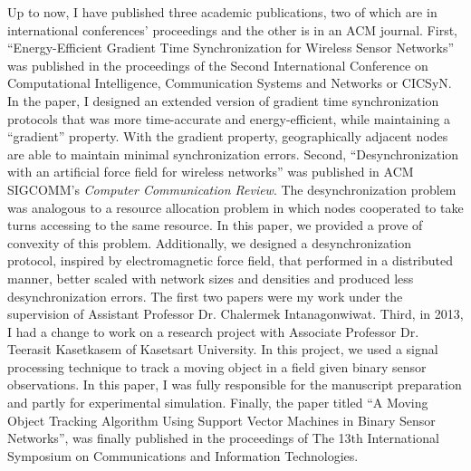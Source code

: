 \documentclass[a4paper,10pt]{report}
\begin{document}
\vspace{0.2cm}
Up to now, I have published three academic publications, two of which are in international conferences' proceedings and the other is in an ACM journal.  First, ``Energy-Efficient Gradient Time Synchronization for Wireless Sensor Networks'' was published in the proceedings of the Second International Conference on Computational Intelligence, Communication Systems and Networks or CICSyN. In the paper, I designed an extended version of gradient time synchronization protocols that was more time-accurate and energy-efficient, while maintaining a ``gradient'' property. With the gradient property, geographically adjacent nodes are able to maintain minimal synchronization errors. Second, ``Desynchronization with an artificial force field for wireless networks'' was published in ACM SIGCOMM's \textit{Computer Communication Review}. The desynchronization problem was analogous to a resource allocation problem in which nodes cooperated to take turns accessing to the same resource. In this paper, we provided a prove of convexity of this problem. Additionally, we designed a desynchronization protocol, inspired by electromagnetic force field, that performed in a distributed manner, better scaled with network sizes and densities and produced less desynchronization errors. The first two papers were my work under the supervision of Assistant Professor Dr. Chalermek Intanagonwiwat. Third, in 2013, I had a change to work on a research project with Associate Professor Dr. Teerasit Kasetkasem of Kasetsart University. In this project, we used a signal processing technique to track a moving object in a field given binary sensor observations. In this paper, I was fully responsible for the manuscript preparation and partly for experimental simulation. Finally, the paper titled ``A Moving Object Tracking Algorithm Using Support Vector Machines in Binary Sensor Networks'', was finally published in the proceedings of The 13th International Symposium on Communications and Information Technologies.
\end{document}

